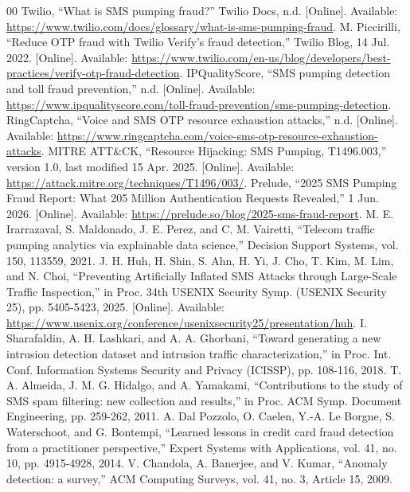 \documentclass[conference]{IEEEtran}
\begin{document}
\begingroup
\scriptsize
\begin{thebibliography}{00}
\setlength{\itemsep}{0pt}
 Twilio, ``What is SMS pumping fraud?'' Twilio Docs, n.d. [Online]. Available: \url{https://www.twilio.com/docs/glossary/what-is-sms-pumping-fraud}.
 M. Piccirilli, ``Reduce OTP fraud with Twilio Verify's fraud detection,'' Twilio Blog, 14 Jul. 2022. [Online]. Available: \url{https://www.twilio.com/en-us/blog/developers/best-practices/verify-otp-fraud-detection}.
 IPQualityScore, ``SMS pumping detection and toll fraud prevention,'' n.d. [Online]. Available: \url{https://www.ipqualityscore.com/toll-fraud-prevention/sms-pumping-detection}.
 RingCaptcha, ``Voice and SMS OTP resource exhaustion attacks,'' n.d. [Online]. Available: \url{https://www.ringcaptcha.com/voice-sms-otp-resource-exhaustion-attacks}.
 MITRE ATT\&CK, ``Resource Hijacking: SMS Pumping, T1496.003,'' version 1.0, last modified 15 Apr. 2025. [Online]. Available: \url{https://attack.mitre.org/techniques/T1496/003/}.
 Prelude, ``2025 SMS Pumping Fraud Report: What 205 Million Authentication Requests Revealed,'' 1 Jun. 2026. [Online]. Available: \url{https://prelude.so/blog/2025-sms-fraud-report}.
 M. E. Irarrazaval, S. Maldonado, J. E. Perez, and C. M. Vairetti, ``Telecom traffic pumping analytics via explainable data science,'' Decision Support Systems, vol. 150, 113559, 2021.
 J. H. Huh, H. Shin, S. Ahn, H. Yi, J. Cho, T. Kim, M. Lim, and N. Choi, ``Preventing Artificially Inflated SMS Attacks through Large-Scale Traffic Inspection,'' in Proc. 34th USENIX Security Symp. (USENIX Security 25), pp. 5405-5423, 2025. [Online]. Available: \url{https://www.usenix.org/conference/usenixsecurity25/presentation/huh}.
 I. Sharafaldin, A. H. Lashkari, and A. A. Ghorbani, ``Toward generating a new intrusion detection dataset and intrusion traffic characterization,'' in Proc. Int. Conf. Information Systems Security and Privacy (ICISSP), pp. 108-116, 2018.
 T. A. Almeida, J. M. G. Hidalgo, and A. Yamakami, ``Contributions to the study of SMS spam filtering: new collection and results,'' in Proc. ACM Symp. Document Engineering, pp. 259-262, 2011.
 A. Dal Pozzolo, O. Caelen, Y.-A. Le Borgne, S. Waterschoot, and G. Bontempi, ``Learned lessons in credit card fraud detection from a practitioner perspective,'' Expert Systems with Applications, vol. 41, no. 10, pp. 4915-4928, 2014.
 V. Chandola, A. Banerjee, and V. Kumar, ``Anomaly detection: a survey,'' ACM Computing Surveys, vol. 41, no. 3, Article 15, 2009.

\end{thebibliography}
\end{document}
